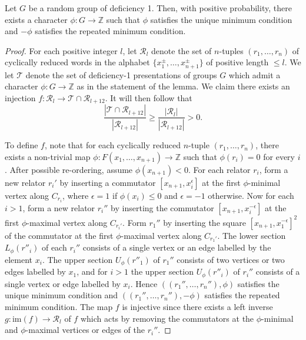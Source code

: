 \begin{lemma}\label{min_max}
Let $G$ be a random group of deficiency 1. Then, with positive probability, there exists a character $\phi \colon G \to \mathbb{Z}$ such that $\phi$ satisfies the unique minimum condition and $-\phi$ satisfies the repeated minimum condition. 
\end{lemma}

\begin{proof}
For each positive integer $l$, let $\mathcal{R}_l$ denote the set of $n$-tuples $(r_1, \ldots, r_n)$ of cyclically reduced words in the alphabet $\{x_1^{\pm}, \ldots, x_{n+1}^{\pm}\}$ of positive length $\leq l$. We let $\mathcal{T}$ denote the set of deficiency-1 presentations of groups $G$ which admit a character $\phi \colon G \to \mathbb{Z}$ as in the statement of the lemma. We claim there exists an injection $f \colon \mathcal{R}_l \to \mathcal{T} \cap \mathcal{R}_{l+12}$. It will then follow that 
\[ \frac{|\mathcal{T} \cap \mathcal{R}_{l+12}|}{|\mathcal{R}_{l+12}|} \geq \frac{|\mathcal{R}_l|}{|\mathcal{R}_{l+12}|} > 0. \]

To define $f$, note that for each cyclically reduced $n$-tuple $(r_1, \ldots, r_n)$, there exists a non-trivial map $\phi \colon F(x_1, \ldots, x_{n+1}) \to \mathbb{Z}$ such that $\phi(r_i) = 0$ for every $i$. After possible re-ordering, assume $\phi(x_{n+1}) < 0$. For each relator $r_i$, form a new relator $r_i'$ by inserting a commutator $[x_{n+1}, x_i^{\epsilon}]$ at the first $\phi$-minimal vertex along $C_{r_i}$, where $\epsilon = 1$ if $\phi(x_i) \leq 0$ and $\epsilon = -1$ otherwise. Now for each $i > 1$, form a new relator ${r_i}''$ by inserting the commutator $[x_{n+1}, x_i^{-\epsilon}]$ at the first $\phi$-maximal vertex along $C_{r_i'}$. Form $r_1''$ by inserting the square $[x_{n+1}, x_1^{-\epsilon}]^2$ of the commutator at the first $\phi$-maximal vertex along $C_{r_1'}$. The lower section $L_{\phi}(r''_i)$ of each $r_i''$ consists of a single vertex or an edge labelled by the element $x_i$. The upper section $U_{\phi}(r''_{1})$ of $r_1''$ consists of two vertices or two edges labelled by $x_1$, and for $i > 1$ the upper section $U_{\phi}(r''_{i})$ of $r_i''$ consists of a single vertex or edge labelled by $x_i$. Hence $((r_1'', \ldots, r_n''), \phi)$ satisfies the unique minimum condition and $((r_1'', \ldots, r_n''), -\phi)$ satisfies the repeated minimum condition. The map $f$ is injective since there exists a left inverse $g \colon \mathrm{im}(f) \to \mathcal{R}_l$  of $f$ which acts by removing the commutators at the $\phi$-minimal and $\phi$-maximal vertices or edges of the $r_i''$. \end{proof}

